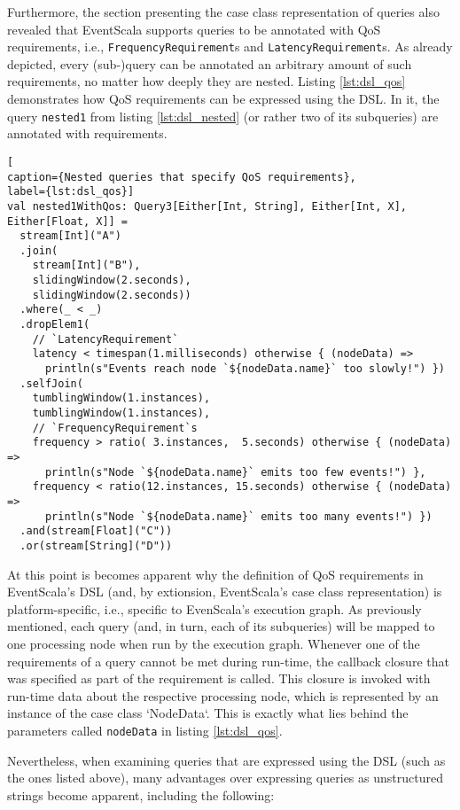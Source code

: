 \documentclass[article, type=bsc, colorback, accentcolor=tud8b, parskip=half, bibliography=totocnumbered]{tudthesis}
\begin{document}
Furthermore, the section presenting the case class representation of queries also revealed that EventScala supports queries to be annotated with QoS requirements, i.e., \lstinline{FrequencyRequirement}s and  \lstinline{LatencyRequirement}s.
As already depicted, every (sub-)query can be annotated an arbitrary amount of such requirements, no matter how deeply they are nested.
Listing \ref{lst:dsl_qos} demonstrates how QoS requirements can be expressed using the DSL.
In it, the query  \lstinline{nested1} from listing \ref{lst:dsl_nested} (or rather two of its subqueries) are annotated with requirements.

\begin{lstlisting}[
caption={Nested queries that specify QoS requirements},
label={lst:dsl_qos}]
val nested1WithQos: Query3[Either[Int, String], Either[Int, X], Either[Float, X]] =
  stream[Int]("A")
  .join(
    stream[Int]("B"),
    slidingWindow(2.seconds),
    slidingWindow(2.seconds))
  .where(_ < _)
  .dropElem1(
    // `LatencyRequirement`
    latency < timespan(1.milliseconds) otherwise { (nodeData) =>
      println(s"Events reach node `${nodeData.name}` too slowly!") })
  .selfJoin(
    tumblingWindow(1.instances),
    tumblingWindow(1.instances),
    // `FrequencyRequirement`s
    frequency > ratio( 3.instances,  5.seconds) otherwise { (nodeData) =>
      println(s"Node `${nodeData.name}` emits too few events!") },
    frequency < ratio(12.instances, 15.seconds) otherwise { (nodeData) =>
      println(s"Node `${nodeData.name}` emits too many events!") })
  .and(stream[Float]("C"))
  .or(stream[String]("D"))
\end{lstlisting}

At this point is becomes apparent why the definition of QoS requirements in EventScala's DSL (and, by extionsion, EventScala's case class representation) is platform-specific, i.e., specific to EvenScala's execution graph.
As previously mentioned, each query (and, in turn, each of its subqueries) will be mapped to one processing node when run by the execution graph.
Whenever one of the requirements of a query cannot be met during run-time, the callback closure that was specified as part of the requirement is called.
This closure is invoked with run-time data about the respective processing node, which is represented by an instance of the case class `NodeData`.
This is exactly what lies behind the parameters called \lstinline{nodeData} in listing \ref{lst:dsl_qos}.

Nevertheless, when examining queries that are expressed using the DSL (such as the ones listed above), many advantages over expressing queries as unstructured strings become apparent, including the following:
\end{document}
